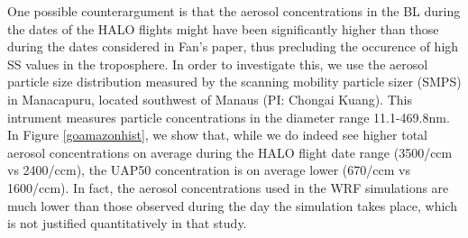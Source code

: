 \documentclass{article}
\begin{document}
One possible counterargument is that the aerosol concentrations in the BL during the dates of the HALO flights might have been significantly higher than those during the dates considered in Fan's paper, thus precluding the occurence of high SS values in the troposphere. In order to investigate this, we use the aerosol particle size distribution measured by the scanning mobility particle sizer (SMPS) in Manacapuru, located southwest of Manaus (PI: Chongai Kuang). This intrument measures particle concentrations in the diameter range 11.1-469.8nm. In Figure \ref{goamazonhist}, we show that, while we do indeed see higher total aerosol concentrations on average during the HALO flight date range (3500/ccm vs 2400/ccm), the UAP50 concentration is on average lower (670/ccm vs 1600/ccm). In fact, the aerosol concentrations used in the WRF simulations are much lower than those observed during the day the simulation takes place, which is not justified quantitatively in that study.
\end{document}
